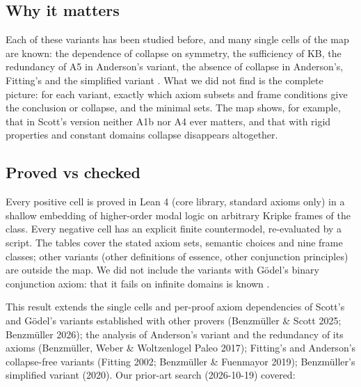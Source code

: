 \documentclass{article}
\begin{document}
\subsection*{Why it matters}

Each of these variants has been studied before, and many single cells of the map are known: the
dependence of collapse on symmetry, the sufficiency of KB, the redundancy of A5 in Anderson's
variant, the absence of collapse in Anderson's, Fitting's and the simplified variant
\cite{benzmueller2025notes,benzmueller2026lean,benzmueller2017hajek,benzmueller2020simplified}.
What we did not find is the complete picture: for each variant, exactly which axiom subsets and
frame conditions give the conclusion or collapse, and the minimal sets. The map shows, for
example, that in Scott's version neither A1b nor A4 ever matters, and that with rigid
properties and constant domains collapse disappears altogether.

\subsection*{Proved vs checked}

Every positive cell is proved in Lean 4 (core library, standard axioms only) in a shallow
embedding of higher-order modal logic on arbitrary Kripke frames of the class. Every negative
cell has an explicit finite countermodel, re-evaluated by a script. The tables cover the stated
axiom sets, semantic choices and nine frame classes; other variants (other definitions of
essence, other conjunction principles) are outside the map. We did not include the variants with
Gödel's binary conjunction axiom: that it fails on infinite domains is known
\cite{benzmueller2026ultrafilters}.

This result extends the single cells and per-proof axiom dependencies of Scott's and Gödel's variants established with other provers (Benzmüller \& Scott 2025; Benzmüller 2026); the analysis of Anderson's variant and the redundancy of its axioms (Benzmüller, Weber \& Woltzenlogel Paleo 2017); Fitting's and Anderson's collapse-free variants (Fitting 2002; Benzmüller \& Fuenmayor 2019); Benzmüller's simplified variant (2020). Our prior-art search (2026-10-19) covered:
\end{document}
